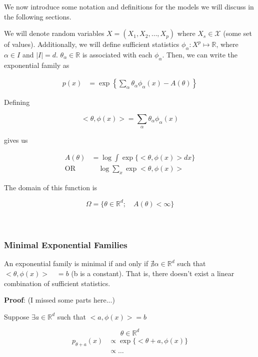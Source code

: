 \documentclass[11pt]{article}
\newcommand{\X}{\mathcal{X}}
\newcommand{\R}{\mathbb{R}}
\begin{document}
We now introduce some notation and definitions for the models we will discuss in the following sections. 

We will denote random variables $X = (X_1, X_2, \ldots, X_p)$ where $X_s \in \X$ (some set of values). Additionally, we will define sufficient statistics $\phi_\alpha: X^p \mapsto \R$, where $\alpha \in I$ and $|I| = d$. $\theta_\alpha \in \R$ is associated with each $\phi_\alpha$. Then, we can write the exponential family as

\begin{align}
p(x) & = \exp \left \{ \sum_\alpha \theta_\alpha \phi_\alpha (x) - A(\theta)   \right \} 
\end{align}

Defining 

\begin{equation}
<\theta, \phi(x)> = \sum_\alpha \theta_\alpha \phi_\alpha (x)
\end{equation}

gives us 

\begin{align}
A(\theta) & = \log \int \exp \{ <\theta, \phi(x)> dx  \} \\
\text{OR} & \quad \log \sum_x \exp <\theta, \phi(x)>
\end{align}

The domain of this function is 

$$ \Omega = \{\theta \in \R^d; \quad A(\theta) < \infty\} $$
\\ \\
\subsubsection*{Minimal Exponential Families}

An exponential family is minimal if and only if $\nexists \alpha \in \R^d$ such that $<\theta, \phi(x)> \quad = b$ (b is a constant). That is, there doesn't exist a linear combination of sufficient statistics. 

\textbf{Proof}: (I missed some parts here...)

Suppose $\exists a \in \R^d$ such that $<a, \phi(x)> = b$

$$ \theta \in \R^d$$
\begin{align}
p_{\theta+a} (x) & \propto \exp \{ <\theta + a, \phi(x) \} \\
& \propto \ldots
\end{align}


\end{document}
